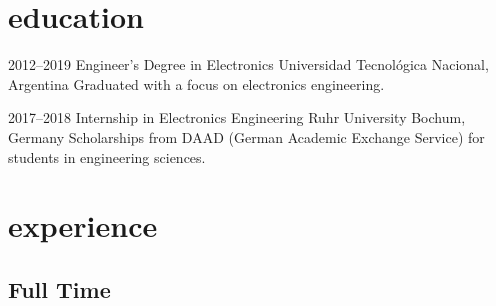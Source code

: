 \documentclass[a4paper,nocolors]{cv-friggeri-x}
\begin{document}

\section{education}

\begin{entrylist}


\entry
{2012--2019}
{Engineer’s Degree {\normalfont in Electronics}}
{Universidad Tecnológica Nacional, Argentina}
{Graduated with a focus on electronics engineering.}


\entry
{2017--2018}
{Internship {\normalfont in Electronics Engineering}}
{Ruhr University Bochum, Germany}
{Scholarships from DAAD (German Academic Exchange Service) for students in engineering sciences.}

\end{entrylist}


\section{experience}

\subsection{Full Time}
\end{document}
